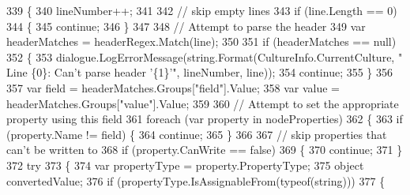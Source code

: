 \begin{DoxyCode}
339                             \{
340                                 lineNumber++;
341 
342                                 \textcolor{comment}{// skip empty lines}
343                                 \textcolor{keywordflow}{if} (line.Length == 0)
344                                 \{
345                                     \textcolor{keywordflow}{continue};
346                                 \}
347 
348                                 \textcolor{comment}{// Attempt to parse the header}
349                                 var headerMatches = headerRegex.Match(line);
350 
351                                 \textcolor{keywordflow}{if} (headerMatches == null)
352                                 \{
353                                     dialogue.LogErrorMessage(string.Format(CultureInfo.CurrentCulture, \textcolor{stringliteral}{"
      Line \{0\}: Can't parse header '\{1\}'"}, lineNumber, line));
354                                     \textcolor{keywordflow}{continue};
355                                 \}
356 
357                                 var field = headerMatches.Groups[\textcolor{stringliteral}{"field"}].Value;
358                                 var value = headerMatches.Groups[\textcolor{stringliteral}{"value"}].Value;
359 
360                                 \textcolor{comment}{// Attempt to set the appropriate property using this field}
361                                 \textcolor{keywordflow}{foreach} (var property \textcolor{keywordflow}{in} nodeProperties)
362                                 \{
363                                     \textcolor{keywordflow}{if} (property.Name != field) \{
364                                         \textcolor{keywordflow}{continue};
365                                     \}
366 
367                                     \textcolor{comment}{// skip properties that can't be written to}
368                                     \textcolor{keywordflow}{if} (property.CanWrite == \textcolor{keyword}{false})
369                                     \{
370                                         \textcolor{keywordflow}{continue};
371                                     \}
372                                     \textcolor{keywordflow}{try}
373                                     \{
374                                         var propertyType = property.PropertyType;
375                                         \textcolor{keywordtype}{object} convertedValue;
376                                         \textcolor{keywordflow}{if} (propertyType.IsAssignableFrom(typeof(\textcolor{keywordtype}{string})))
377                                         \{

\end{DoxyCode}
